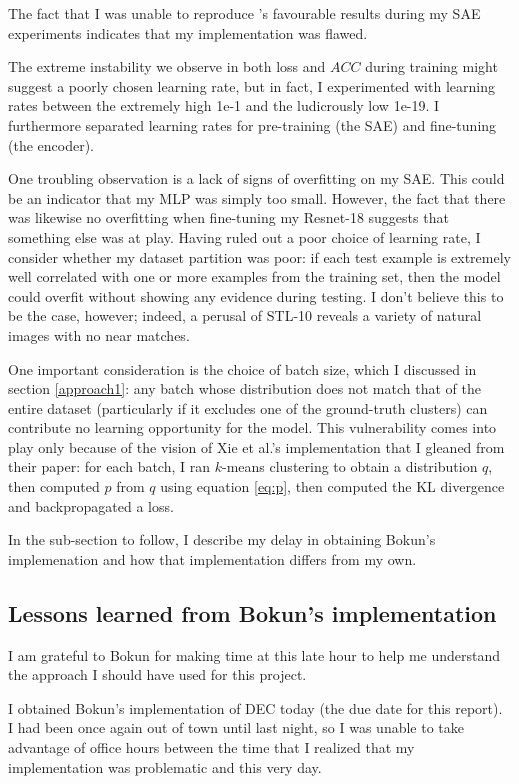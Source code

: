 The fact that I was unable to reproduce \cite{xie2016unsupervised}'s favourable results during my SAE experiments indicates that my implementation was flawed.

The extreme instability we observe in both loss and $ACC$ during training might suggest a poorly chosen learning rate, but in fact, I experimented with learning rates between the extremely high 1e-1 and the ludicrously low 1e-19. I furthermore separated learning rates for pre-training (the SAE) and fine-tuning (the encoder).

One troubling observation is a lack of signs of overfitting on my SAE. This could be an indicator that my MLP was simply too small. However, the fact that there was likewise no overfitting when fine-tuning my Resnet-18 suggests that something else was at play. Having ruled out a poor choice of learning rate, I consider whether my dataset partition was poor: if each test example is extremely well correlated with one or more examples from the training set, then the model could overfit without showing any evidence during testing. I don't believe this to be the case, however; indeed, a perusal of STL-10 reveals a variety of natural images with no near matches.

One important consideration is the choice of batch size, which I discussed in section \ref{approach1}: any batch whose distribution does not match that of the entire dataset (particularly if it excludes one of the ground-truth clusters) can contribute no learning opportunity for the model. This vulnerability comes into play only because of the vision of Xie et al.'s implementation that I gleaned from their paper: for each batch, I ran $k$-means clustering to obtain a distribution $q$, then computed $p$ from $q$ using equation \ref{eq:p}, then computed the KL divergence and backpropagated a loss.

In the sub-section to follow, I describe my delay in obtaining Bokun's implemenation and how that implementation differs from my own.

\subsection{Lessons learned from Bokun's implementation}

I am grateful to Bokun for making time at this late hour to help me understand the approach I should have used for this project.

I obtained Bokun's implementation of DEC today (the due date for this report). I had been once again out of town until last night, so I was unable to take advantage of office hours between the time that I realized that my implementation was problematic and this very day.


